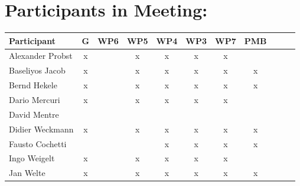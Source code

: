 \documentclass[a4paper, 11pt]{article}
\begin{document}
\section{Participants in Meeting:}

\begin{tabular}{|l|c|c|c|c||c|c|c||c|c|c|}
\hline
\textbf{Participant}  & \textbf{G} & \textbf{WP6} &  \textbf{WP5} & \textbf{WP4}&  \textbf{WP3} & \textbf{WP7}&  \textbf{PMB} \\\hline
Alexander Probst      & x &   & x & x & x & x &   \\\hline  
Baseliyos Jacob       & x &   & x & x & x & x & x \\\hline 
Bernd Hekele          & x &   & x & x & x & x & x \\\hline
Dario Mercuri        & x &   & x & x & x & x &   \\\hline
David Mentre         &  &   &   &   &   &   &   \\\hline
Didier Weckmann      & x &   & x & x & x & x & x \\\hline
Fausto Cochetti      &   &   &   & x & x & x & x \\\hline
Ingo Weigelt         & x  &   & x & x & x & x &   \\\hline
Jan Welte            & x &   & x & x & x & x & x \\\hline

\end{tabular}
\end{document}
